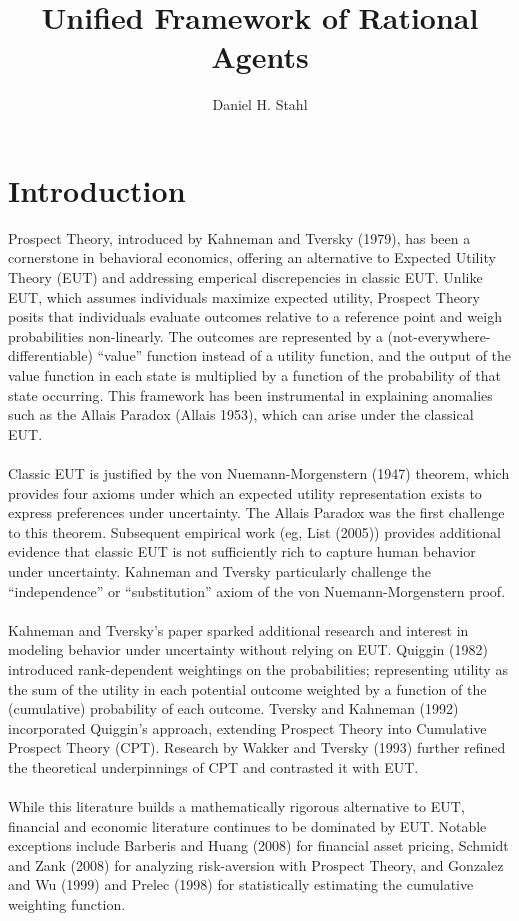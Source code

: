 \documentclass{article}
\begin{document}
	
	
\title{Unified Framework of Rational Agents}
\date{}
\author{Daniel H. Stahl}

\section{Introduction}

Prospect Theory, introduced by Kahneman and Tversky (1979), has been a cornerstone in behavioral economics, offering an alternative to Expected Utility Theory (EUT) and addressing emperical discrepencies in classic EUT. Unlike EUT, which assumes individuals maximize expected utility, Prospect Theory posits that individuals evaluate outcomes relative to a reference point and weigh probabilities non-linearly. The outcomes are represented by a (not-everywhere-differentiable) ``value'' function instead of a utility function, and the output of the value function in each state is multiplied by a function of the probability of that state occurring.  This framework has been instrumental in explaining anomalies such as the Allais Paradox (Allais 1953), which can arise under the classical EUT.  
\\
\\
Classic EUT is justified by the von Nuemann-Morgenstern (1947) theorem, which provides four axioms under which an expected utility representation exists to express preferences under uncertainty.  The Allais Paradox was the first challenge to this theorem.  Subsequent empirical work (eg, List (2005)) provides additional evidence that classic EUT is not sufficiently rich to capture human behavior under uncertainty.  Kahneman and Tversky particularly challenge the ``independence'' or ``substitution'' axiom of the von Nuemann-Morgenstern proof.
\\
\\
Kahneman and Tversky's paper sparked additional research and interest in modeling behavior under uncertainty without relying on EUT.  Quiggin (1982) introduced rank-dependent weightings on the probabilities; representing utility as the sum of the utility in each potential outcome weighted by a function of the (cumulative) probability of each outcome. Tversky and Kahneman (1992) incorporated Quiggin's approach, extending Prospect Theory into Cumulative Prospect Theory (CPT).  Research by Wakker and Tversky (1993) further refined the theoretical underpinnings of CPT and contrasted it with EUT.
\\
\\
While this literature builds a mathematically rigorous alternative to EUT, financial and economic literature continues to be dominated by EUT.  Notable exceptions include Barberis and Huang (2008) for financial asset pricing, Schmidt and Zank (2008) for analyzing risk-aversion with Prospect Theory, and Gonzalez and Wu (1999) and Prelec (1998) for statistically estimating the cumulative weighting function.  
\end{document}
